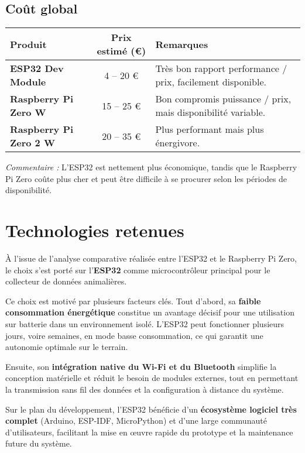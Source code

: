 \documentclass{param}
\begin{document}
\subsection{Coût global}
\begin{center}
\renewcommand{\arraystretch}{1.3}
\begin{tabularx}{0.8\textwidth}{|>{\bfseries}l|c|X|}
\hline
\textbf{Produit} & \textbf{Prix estimé (€)} & \textbf{Remarques} \\
\hline
ESP32 Dev Module & 4 – 20 € & Très bon rapport performance / prix, facilement disponible. \\
\hline
Raspberry Pi Zero W & 15 – 25 € & Bon compromis puissance / prix, mais disponibilité variable. \\
\hline
Raspberry Pi Zero 2 W & 20 – 35 € & Plus performant mais plus énergivore. \\
\hline
\end{tabularx}
\end{center}

\noindent\textit{Commentaire :}  
L’ESP32 est nettement plus économique, tandis que le Raspberry Pi Zero coûte plus cher et peut être difficile à se procurer selon les périodes de disponibilité.
\vspace{20px}

\section{Technologies retenues}
À l’issue de l’analyse comparative réalisée entre l’ESP32 et le Raspberry Pi Zero, le choix s’est porté sur l’\textbf{ESP32} comme microcontrôleur principal pour le collecteur de données animalières.
\newline

Ce choix est motivé par plusieurs facteurs clés. Tout d’abord, sa \textbf{faible consommation énergétique} constitue un avantage décisif pour une utilisation sur batterie dans un environnement isolé. L’ESP32 peut fonctionner plusieurs jours, voire semaines, en mode basse consommation, ce qui garantit une autonomie optimale sur le terrain.  
\newline

Ensuite, son \textbf{intégration native du Wi-Fi et du Bluetooth} simplifie la conception matérielle et réduit le besoin de modules externes, tout en permettant la transmission sans fil des données et la configuration à distance du système.  
\newline

Sur le plan du développement, l’ESP32 bénéficie d’un \textbf{écosystème logiciel très complet} (Arduino, ESP-IDF, MicroPython) et d’une large communauté d’utilisateurs, facilitant la mise en œuvre rapide du prototype et la maintenance future du système.  
\newline
\end{document}
